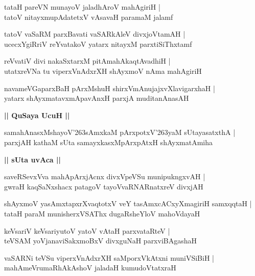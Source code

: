 \documentclass[twoside,12pt,openright]{book}
\def\S{\char'263}
\newcounter{shloka}[chapter]
\def\uvaca#1{\centerline{{\large\textbf{#1}}}}
\begin{document}
\begin{shloka}
tataH pareVN munayoV jaladhAroV mahAgiriH |\\
tatoV nitayxmupAdatetxV vAsavaH paramaM jalamf
\end{shloka}

\begin{shloka}
tatoV vaSaRM parxBavati vaSARkAleV divxjoVtamAH |\\
ucecxYgiRriV reYvatakoV yatarx nitayxM parxtiSiThxtamf
\end{shloka}

\begin{shloka}
reVvatiV divi nakaSxtarxM pitAmahAkaqtAvadhiH |\\
utatxreVNa tu viperxVnAdxrXH shAyxmoV nAma mahAgiriH 
\end{shloka}

\begin{shloka}
navameVGaparxBaH pArxMshuH shirxVmAnujajxvXlavigarxhaH |\\
yatarx shAyxmatavxmApavAnxH parxjA muditanAnasAH 
\end{shloka}

\uvaca {|| QuSaya UcuH ||}

\begin{shloka}
samahAnasxMshayoV\S sAmxkaM pArxpotxV\S yaM sUtayasatxthA |\\
parxjAH kathaM sUta samayxkasxMpArxpAtxH shAyxmatAmiha
\end{shloka}

\uvaca{|| sUta uvAca ||}

\begin{shloka}
saveRSevxVva mahApArxjAcnx divxVpeVSu munipukngxvAH |\\
gwraH kaqSaNxshacx patagoV tayoVvaRNARnatxreV divxjAH
\end{shloka} 

\begin{shloka}
shAyxmoV yasAmxtapxrXvaqtotxV veY tasAmxcACxyXmagiriH samxqqtaH |\\
tataH paraM munisherxVSAThx dugaRsheYloV mahoVdayaH 
\end{shloka}

\begin{shloka}
keVsariV keVsariyutoV yatoV vAtaH parxvataRteV |\\
teVSAM yoVjanaviSakxmoBxV divxguNaH parxviBAgashaH
\end{shloka}

\begin{shloka}
vaSARNi teVSu viperxVnAdxrXH saMporxVkAtxni muniVSiBiH |\\
mahAmeVrumaRhAkAshoV jaladaH kumudoVtatxraH 
\end{shloka}
\end{document}
